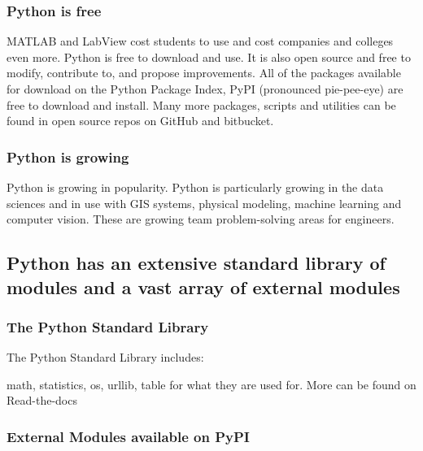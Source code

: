 \documentclass{book}
\begin{document}
\subsubsection{Python is free}\label{python-is-free}

MATLAB and LabView cost students to use and cost companies and colleges
even more. Python is free to download and use. It is also open source
and free to modify, contribute to, and propose improvements. All of the
packages available for download on the Python Package Index, PyPI
(pronounced pie-pee-eye) are free to download and install. Many more
packages, scripts and utilities can be found in open source repos on
GitHub and bitbucket.

\subsubsection{Python is growing}\label{python-is-growing}

Python is growing in popularity. Python is particularly growing in the
data sciences and in use with GIS systems, physical modeling, machine
learning and computer vision. These are growing team problem-solving
areas for engineers.
    




    
        \subsection{Python has an extensive standard library of modules and a
vast array of external
modules}\label{python-has-an-extensive-standard-library-of-modules-and-a-vast-array-of-external-modules}
    




    
        \subsubsection{The Python Standard
Library}\label{the-python-standard-library}

The Python Standard Library includes:

math, statistics, os, urllib, table for what they are used for. More can
be found on Read-the-docs

\subsubsection{External Modules available on
PyPI}\label{external-modules-available-on-pypi}
\end{document}
